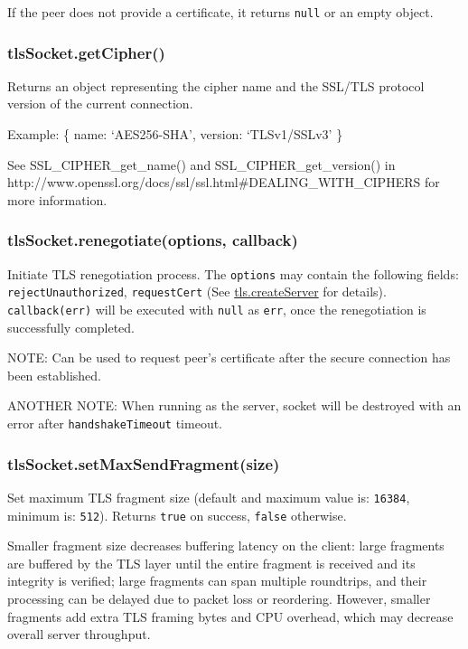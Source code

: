 If the peer does not provide a certificate, it returns \texttt{null} or
an empty object.

\subsubsection{tlsSocket.getCipher()}\label{tlssocket.getcipher}

Returns an object representing the cipher name and the SSL/TLS protocol
version of the current connection.

Example: \{ name: `AES256-SHA', version: `TLSv1/SSLv3' \}

See SSL\_CIPHER\_get\_name() and SSL\_CIPHER\_get\_version() in
http://www.openssl.org/docs/ssl/ssl.html\#DEALING\_WITH\_CIPHERS for
more information.

\subsubsection{tlsSocket.renegotiate(options,
callback)}\label{tlssocket.renegotiateoptions-callback}

Initiate TLS renegotiation process. The \texttt{options} may contain the
following fields: \texttt{rejectUnauthorized}, \texttt{requestCert} (See
\hyperref[tlsux5ftlsux5fcreateserverux5foptionsux5fsecureconnectionlistener]{tls.createServer}
for details). \texttt{callback(err)} will be executed with \texttt{null}
as \texttt{err}, once the renegotiation is successfully completed.

NOTE: Can be used to request peer's certificate after the secure
connection has been established.

ANOTHER NOTE: When running as the server, socket will be destroyed with
an error after \texttt{handshakeTimeout} timeout.

\subsubsection{tlsSocket.setMaxSendFragment(size)}\label{tlssocket.setmaxsendfragmentsize}

Set maximum TLS fragment size (default and maximum value is:
\texttt{16384}, minimum is: \texttt{512}). Returns \texttt{true} on
success, \texttt{false} otherwise.

Smaller fragment size decreases buffering latency on the client: large
fragments are buffered by the TLS layer until the entire fragment is
received and its integrity is verified; large fragments can span
multiple roundtrips, and their processing can be delayed due to packet
loss or reordering. However, smaller fragments add extra TLS framing
bytes and CPU overhead, which may decrease overall server throughput.

